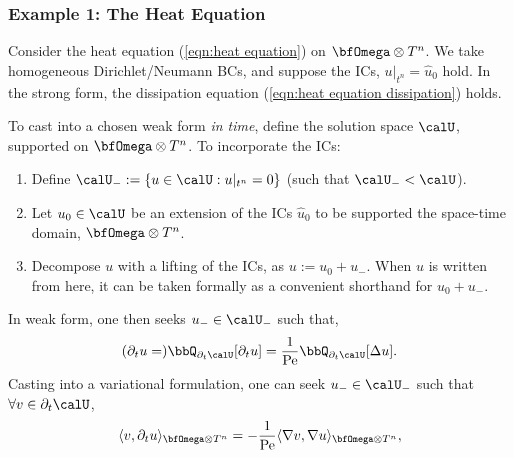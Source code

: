 \subsubsection{Example 1: The Heat Equation}
    \begin{example}
        Consider the heat equation (\ref{eqn:heat equation}) on $\bfOmega\otimes T^{n}$. We take homogeneous Dirichlet/Neumann BCs, and suppose the ICs, $u|_{t^{n}}  =  \widehat{u}_{0}$ hold. In the strong form, the dissipation equation (\ref{eqn:heat equation dissipation}) holds.

        To cast into a chosen weak form \emph{in time}, define the solution space $\calU$, supported on $\bfOmega\otimes T^{n}$. To incorporate the ICs:
        \begin{enumerate}
            \item  Define $\calU_{-}  :=  \{u  \in  \calU  :  u|_{t^{n}}  =  0\}$ (such that $\calU_{-}  <  \calU$).
            \item  Let $u_{0}  \in  \calU$ be an extension of the ICs $\widehat{u}_{0}$ to be supported the space-time domain, $\bfOmega\otimes T^{n}$.
            \item  Decompose $u$ with a lifting of the ICs, as $u  :=  u_{0} + u_{-}$. When $u$ is written from here, it can be taken formally as a convenient shorthand for $u_{0} + u_{-}$.
        \end{enumerate}
        In weak form, one then seeks $u_{-}  \in  \calU_{-}$ such that,
        \begin{equation}\label{eqn:heat equation weak form}
            (\partial_{t}u  =)  \bbQ_{\partial_{t}\calU}[\partial_{t}u]  =  \frac{1}{\rmPe}\bbQ_{\partial_{t}\calU}[\Delta u].
        \end{equation}
        Casting into a variational formulation, one can seek $u_{-}  \in  \calU_{-}$ such that $\forall  v  \in  \partial_{t}\calU$,
        \begin{equation}\label{eqn:heat equation variational form}
            \langle v, \partial_{t}u\rangle_{\bfOmega\otimes T^{n}}  =   - \frac{1}{\rmPe}\langle\nabla v, \nabla u\rangle_{\bfOmega\otimes T^{n}},
        \end{equation}
        

\end{example}
